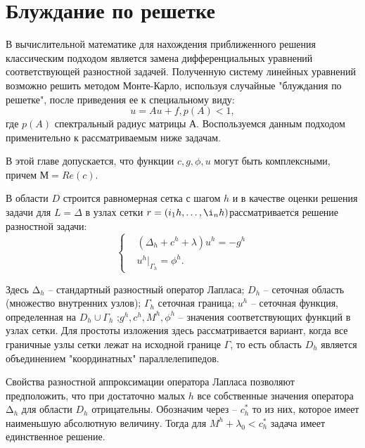 \section{Блуждание по решетке}
\label{Bl}
В вычислительной математике для нахождения приближенного решения классическим подходом является замена дифференциальных уравнений соответствующей разностной задачей. Полученную систему линейных уравнений возможно решить методом Монте-Карло, используя случайные "блуждания по решетке", после приведения ее к специальному виду:
\begin{equation}
	u = Au + f, p(A) < 1,
\end{equation}
где $p(A)$  спектральный радиус матрицы А. Воспользуемся данным подходом применительно к рассматриваемым ниже задачам.

В этой главе допускается, что функции $c, g, \phi, u$ могут быть комплексными, причем $М = Re(c)$.

В области $D$ строится равномерная сетка с шагом $h$ и в качестве
оценки решения задачи для $L = \Delta $ в узлах сетки $r=(i_{1}h,\dots,\i_{n}h) $рассматривается решение разностной задачи:
\begin{equation} 
	\left\{
\begin{aligned}
& (\Delta_{h}+c^{h}+\lambda)u^{h}=-g^{h}\\ & u^{h}|_{\Gamma_{h}}=\phi^{h}.
\end{aligned}
 \right. 
 \label{qw1}
 \end{equation}
 
Здесь $∆_{h} $ -- стандартный разностный оператор Лапласа; $D_{h}$ -- сеточная область (множество внутренних узлов); $Γ_{h}$  сеточная граница; $u^{h}$ --  сеточная функция, определенная на $D_{h} \cup \Gamma_{h}$ ;$g^{h},c^{h},M^{h},\phi^{h}$ -- значения соответствующих функций в узлах сетки. Для простоты изложения здесь
рассматривается вариант, когда все граничные узлы сетки лежат на исходной границе $Γ$, то есть область $D_{h}$ является объединением "координатных" параллелепипедов.

Свойства разностной аппроксимации оператора Лапласа позволяют
предположить, что при достаточно малых $h$ все собственные значения
оператора $∆_{h}$ для области $D_{h}$ отрицательны. Обозначим через -- $c^{*}_{h}$ то из них, которое имеет наименьшую абсолютную величину. Тогда для $ M^{h}+\lambda_{0} < c^{*}_{h} $
задача имеет единственное решение.

